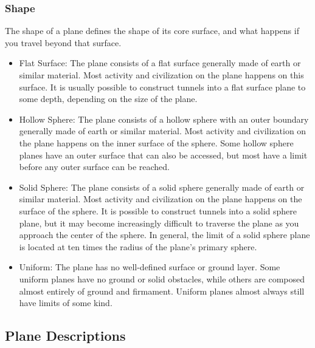         \subsubsection{Shape} The shape of a plane defines the shape of its core surface, and what happens if you travel beyond that surface.

            \begin{itemize}
                \item Flat Surface: The plane consists of a flat surface generally made of earth or similar material.
                    Most activity and civilization on the plane happens on this surface.
                    It is usually possible to construct tunnels into a flat surface plane to some depth, depending on the size of the plane.
                \item Hollow Sphere: The plane consists of a hollow sphere with an outer boundary generally made of earth or similar material.
                    Most activity and civilization on the plane happens on the inner surface of the sphere.
                    Some hollow sphere planes have an outer surface that can also be accessed, but most have a limit before any outer surface can be reached.
                \item Solid Sphere: The plane consists of a solid sphere generally made of earth or similar material.
                    Most activity and civilization on the plane happens on the surface of the sphere.
                    It is possible to construct tunnels into a solid sphere plane, but it may become increasingly difficult to traverse the plane as you approach the center of the sphere.
                    In general, the limit of a solid sphere plane is located at ten times the radius of the plane's primary sphere.
                \item Uniform: The plane has no well-defined surface or ground layer.
                    Some uniform planes have no ground or solid obstacles, while others are composed almost entirely of ground and firmament.
                    Uniform planes almost always still have limits of some kind.
            \end{itemize}


    \subsection{Plane Descriptions}

